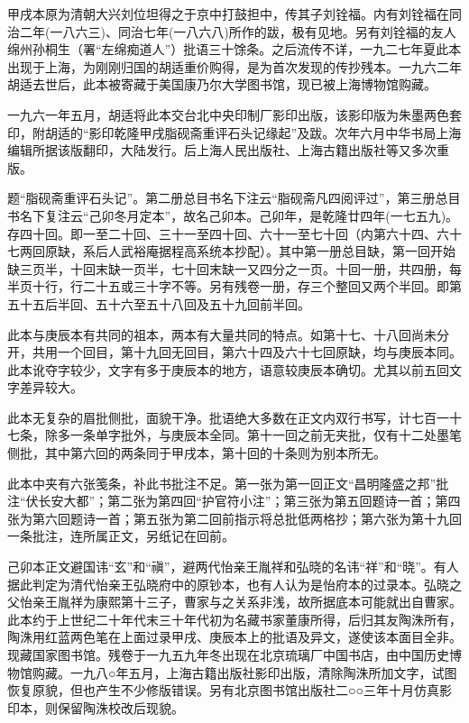 甲戌本原为清朝大兴刘位坦得之于京中打鼓担中，传其子刘铨福。内有刘铨福在同治二年(一八六三)、同治七年(一八六八)所作的跋，极有见地。另有刘铨福的友人绵州孙桐生（署``左绵痴道人''）批语三十馀条。之后流传不详，一九二七年夏此本出现于上海，为刚刚归国的胡适重价购得，是为首次发现的传抄残本。一九六二年胡适去世后，此本被寄藏于美国康乃尔大学图书馆，现已被上海博物馆购藏。

一九六一年五月，胡适将此本交台北中央印制厂影印出版，该影印版为朱墨两色套印，附胡适的``影印乾隆甲戌脂砚斋重评石头记缘起''及跋。次年六月中华书局上海编辑所据该版翻印，大陆发行。后上海人民出版社、上海古籍出版社等又多次重版。

{}

题``脂砚斋重评石头记''。第二册总目书名下注云``脂砚斋凡四阅评过''，第三册总目书名下复注云``己卯冬月定本''，故名己卯本。己卯年，是乾隆廿四年(一七五九)。存四十回。即一至二十回、三十一至四十回、六十一至七十回（内第六十四、六十七两回原缺，系后人武裕庵据程高系统本抄配）。其中第一册总目缺，第一回开始缺三页半，十回末缺一页半，七十回末缺一又四分之一页。十回一册，共四册，每半页十行，行二十五或三十字不等。另有残卷一册，存三个整回又两个半回。即第五十五后半回、五十六至五十八回及五十九回前半回。

此本与庚辰本有共同的祖本，两本有大量共同的特点。如第十七、十八回尚未分开，共用一个回目，第十九回无回目，第六十四及六十七回原缺，均与庚辰本同。此本讹夺字较少，文字有多于庚辰本的地方，语意较庚辰本确切。尤其以前五回文字差异较大。

此本无复杂的眉批侧批，面貌干净。批语绝大多数在正文内双行书写，计七百一十七条，除多一条单字批外，与庚辰本全同。第十一回之前无夹批，仅有十二处墨笔侧批，其中第六回的两条同于甲戌本，第十回的十条则为别本所无。

此本中夹有六张笺条，补此书批注不足。第一张为第一回正文``昌明隆盛之邦''批注``伏长安大都''；第二张为第四回``护官符小注''；第三张为第五回题诗一首；第四张为第六回题诗一首；第五张为第二回前指示将总批低两格抄；第六张为第十九回一条批注，连所属正文，另纸记在回前。

己卯本正文避国讳``玄''和``禛''，避两代怡亲王胤祥和弘晓的名讳``祥''和``晓''。有人据此判定为清代怡亲王弘晓府中的原钞本，也有人认为是怡府本的过录本。弘晓之父怡亲王胤祥为康熙第十三子，曹家与之关系非浅，故所据底本可能就出自曹家。此本约于上世纪二十年代末三十年代初为名藏书家董康所得，后归其友陶洙所有，陶洙用红蓝两色笔在上面过录甲戌、庚辰本上的批语及异文，遂使该本面目全非。现藏国家图书馆。残卷于一九五九年冬出现在北京琉璃厂中国书店，由中国历史博物馆购藏。一九八○年五月，上海古籍出版社影印出版，清除陶洙所加文字，试图恢复原貌，但也产生不少修版错误。另有北京图书馆出版社二○○三年十月仿真影印本，则保留陶洙校改后现貌。

